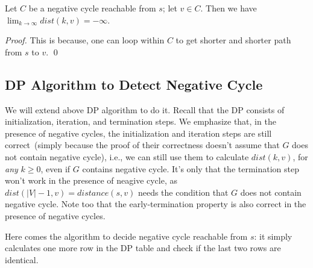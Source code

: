 \begin{fact}
Let $C$ be a negative cycle reachable from $s$;
let $v\in C$. Then we have $\lim_{k\to\infty} dist(k,v) = -\infty$.
\end{fact}
\emph{Proof.} This is because, one can loop within $C$ to get shorter and shorter path from $s$ to $v$. \qed

%

\subsection*{DP Algorithm to Detect Negative Cycle}

We will extend above DP algorithm to do it.
Recall that the DP consists of initialization, iteration, and termination steps.
We emphasize that, in the presence of negative cycles, the initialization and iteration
steps are still correct~(simply because the proof of their correctness doesn't assume that $G$ does not contain negative cycle),
i.e., we can still use them to calculate $dist(k,v)$, for \emph{any} $k\ge 0$, even if $G$ contains negative cycle.
It's only that the termination step won't work in the presence of neagive cycle,
as $dist(|V| - 1, v) = distance(s,v)$ needs the condition that $G$ does not contain negative cycle.
Note too that the early-termination property is also correct in the presence of negative cycles.

Here comes the algorithm to decide negative cycle reachable from $s$:
it simply calculates one more row in the DP table and check if the last two rows are identical.

